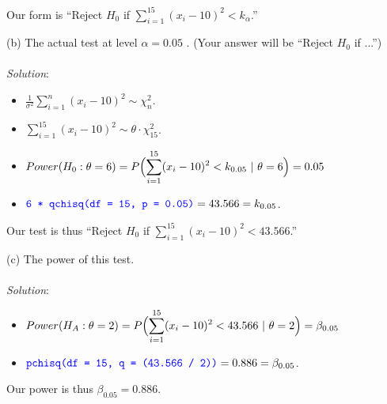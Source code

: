 \documentclass[12pt]{article}
\newcommand{\XBB}{\color{blue}}
\newcommand{\ds}{\displaystyle}
\begin{document}
\noindent
Our form is ``Reject $ H_{0} $ if $ \ds \sum_{i=1}^{15} (x_{i}-10)^{2} < k_{\alpha} $.''

\vspace{2.5mm}

\newpage

(b) The actual test at level $ \alpha = 0.05$ . (Your answer will be ``Reject $ H_{0} $ if ...'') \\
\vspace{2.5mm} \\
\textit{Solution}:
\vspace{2.5mm} \\ 

\begin{itemize}
    \item $ \ds \frac{1}{\sigma^{2}} \sum_{i=1}^{n} (x_{i}-10)^{2} \sim \chi_{n}^{2} $.
    \item $ \ds \sum_{i=1}^{15} (x_{i}-10)^{2} \sim \theta \cdot \chi_{15}^{2} $.
    \item $ \ds Power(H_{0} : \theta = 6) = P \Bigl(\sum_{i=1}^{15} (x_{i}-10)^{2} < k_{0.05} \ | \ \theta = 6 \Bigr) = 0.05 $
    \item $ \ds {\XBB \texttt{6 * qchisq(df = 15, p = 0.05)}} = 43.566 = k_{0.05} $.
\end{itemize}

\noindent
Our test is thus ``Reject $ H_{0} $ if $ \ds \sum_{i=1}^{15} (x_{i}-10)^{2} < 43.566 $.'' \\

\vspace{2.5mm}

(c) The power of this test. \\
\vspace{2.5mm} \\
\textit{Solution}:
\vspace{2.5mm} \\ 

\begin{itemize}
    \item $ \ds Power(H_{A} : \theta = 2) = P \Bigl(\sum_{i=1}^{15} (x_{i}-10)^{2} < 43.566 \ | \ \theta = 2 \Bigr) = \beta_{0.05} $
    \item $ \ds {\XBB \texttt{pchisq(df = 15, q = (43.566 / 2))}} = 0.886 = \beta_{0.05} $.
\end{itemize}

\noindent
Our power is thus $ \beta_{0.05} = 0.886 $. \\

\vspace{2.5mm}
\end{document}

